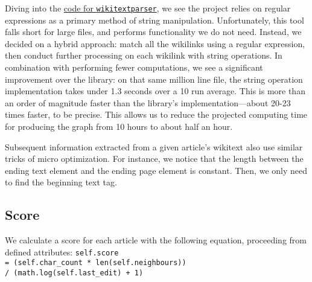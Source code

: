 \documentclass[fontsize=12pt]{article}
\newcommand{\py}[1]{\texttt{#1}}
\begin{document}
\begin{multicols}{2}
    Diving into the \href{https://github.com/5j9/wikitextparser/blob/master/wikitextparser/_wikilink.py}{code for \py{wikitextparser}}, we see the project relies on regular expressions as a primary method of string manipulation. Unfortunately, this tool falls short for large files, and performs functionality we do not need. Instead, we decided on a hybrid approach: match all the wikilinks using a regular expression, then conduct further processing on each wikilink with string operations. In combination with performing fewer computations, we see a significant improvement over the library: on that same million line file, the string operation implementation takes under 1.3 seconds over a 10 run average. This is more than an order of magnitude faster than the library's implementation---about 20-23 times faster, to be precise. This allows us to reduce the projected computing time for producing the graph from 10 hours to about half an hour.

    Subsequent information extracted from a given article's wikitext also use similar tricks of micro optimization. For instance, we notice that the length between the ending text element and the ending page element is constant. Then, we only need to find the beginning text tag. 

    \subsection{Score}
    We calculate a score for each article with the following equation, proceeding from defined attributes: \py{self.score} \\ \py{= (self.char_count * len(self.neighbours))} \\ \py{/ (math.log(self.last_edit) + 1)}


\end{multicols}
\end{document}
